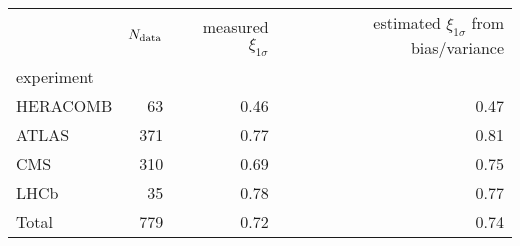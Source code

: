 \begin{center}
    \begin{tabular}{lrrr}
        \toprule
        {} &  $N_{\rm data}$ &  measured $\xi_{1\sigma}$ &  estimated $\xi_{1\sigma}$ from bias/variance \\
        experiment &        &                           &                                                  \\
        \midrule
        HERACOMB   &     63 &                      0.46 &                                             0.47 \\
        ATLAS      &    371 &                      0.77 &                                             0.81 \\
        CMS        &    310 &                      0.69 &                                             0.75 \\
        LHCb       &     35 &                      0.78 &                                             0.77 \\
        Total      &    779 &                      0.72 &                                             0.74 \\
        \bottomrule
        \end{tabular}
\end{center}
